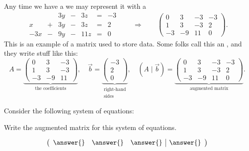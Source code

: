\documentclass{ximera}
\begin{document}
Any time we have a  we may represent it with a
\[
  \begin{array}{rcrcrcr}
         &    & 3y  & -  & 3z   & =  & -3 \\
    x    & +  & 3y  & -  & 3z   & =  & 2 \\
    -3x  & -  & 9y  & -  & 11z  & =  & 0
  \end{array}
  \qquad\Longrightarrow\qquad
  \left(
    \begin{array}{rrr|r}
      0 &   3 & -3 & -3 \\
      1 &   3 & -3 & 2  \\
      -3& -9  & 11 & 0
    \end{array}
  \right).
\]
This is an example of a matrix used to store data. Some folks call
this an , and they write stuff like this:
\[
  A = \underbrace{\left( \begin{array}{rrr}
    0 & 3 & -3  \\
    1 &  3  & -3 \\
    -3 & -9 & 11
  \end{array} \right)}_{\text{the coefficients}},
\quad
\vec{b} =
\underbrace{\left( \begin{array}{r}
  -3\\ 2 \\ 0
\end{array} \right)}_{\begin{smallmatrix}\text{right-hand} \\
  \text{sides} \end{smallmatrix}},
\quad
\left(A \mid \vec{b}\right) = %
\underbrace{\left( \begin{array}{rrr|r}
  0 &   3 & -3 & -3 \\
  1 &   3 & -3 & 2  \\
  -3& -9  & 11 & 0
\end{array} \right)}_{\text{augmented matrix}}.
\]

\begin{question}
  Consider the following system of equations:

  Write the augmented matrix for this system of equations.
  \begin{prompt}
    \[
      \left(
        \begin{array}{ccc|c}
          \answer{} & \answer{} & \answer{} & \answer{}
        \end{array}
      \right)
    \]
  \end{prompt}
\end{question}
\end{document}
